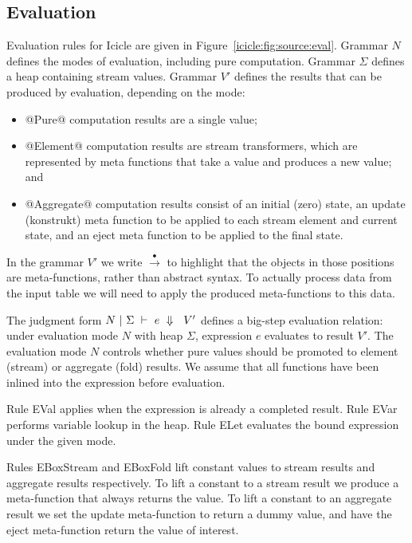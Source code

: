 \subsection{Evaluation}
Evaluation rules for Icicle are given in Figure~\ref{icicle:fig:source:eval}.
Grammar $N$ defines the modes of evaluation, including pure computation.
Grammar $\Sigma$ defines a heap containing stream values.
Grammar $V'$ defines the results that can be produced by evaluation, depending on the mode:
\begin{itemize}
\item
@Pure@ computation results are a single value;
\item
@Element@ computation results are stream transformers, which are represented by meta functions that take a value and produces a new value; and
\item
@Aggregate@ computation results consist of an initial (zero) state, an update (konstrukt) meta function to be applied to each stream element and current state, and an eject meta function to be applied to the final state.
\end{itemize}

In the grammar $V'$ we write $\stackrel{\bullet}{\to}$ to highlight that the objects in those positions are meta-functions, rather than abstract syntax. To actually process data from the input table we will need to apply the produced meta-functions to this data.

The judgment form $N~|~\Sigma~\vdash~e~\Downarrow~~V'$ defines a big-step evaluation relation: under evaluation mode $N$ with heap $\Sigma$, expression $e$ evaluates to result $V'$.
The evaluation mode $N$ controls whether pure values should be promoted to element (stream) or aggregate (fold) results. 
We assume that all functions have been inlined into the expression before evaluation.

Rule EVal applies when the expression is already a completed result.
Rule EVar performs variable lookup in the heap.
Rule ELet evaluates the bound expression under the given mode.



Rules EBoxStream and EBoxFold lift constant values to stream results and aggregate results respectively. To lift a constant to a stream result we produce a meta-function that always returns the value. To lift a constant to an aggregate result we set the update meta-function to return a dummy value, and have the eject meta-function return the value of interest.

